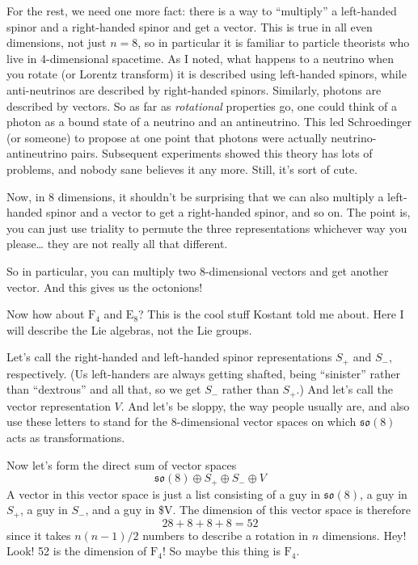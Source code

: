\documentclass{article}
\begin{document}
For the rest, we need one more fact: there is a way to ``multiply'' a
left-handed spinor and a right-handed spinor and get a vector. This is
true in all even dimensions, not just \(n = 8\), so in particular it is
familiar to particle theorists who live in 4-dimensional spacetime. As I
noted, what happens to a neutrino when you rotate (or Lorentz transform)
it is described using left-handed spinors, while anti-neutrinos are
described by right-handed spinors. Similarly, photons are described by
vectors. So as far as \emph{rotational} properties go, one could think
of a photon as a bound state of a neutrino and an antineutrino. This led
Schroedinger (or someone) to propose at one point that photons were
actually neutrino- antineutrino pairs. Subsequent experiments showed
this theory has lots of problems, and nobody sane believes it any more.
Still, it's sort of cute.

Now, in 8 dimensions, it shouldn't be surprising that we can also
multiply a left-handed spinor and a vector to get a right-handed spinor,
and so on. The point is, you can just use triality to permute the three
representations whichever way you please\ldots{} they are not really all
that different.

So in particular, you can multiply two 8-dimensional vectors and get
another vector. And this gives us the octonions!

Now how about \(\mathrm{F}_4\) and \(\mathrm{E}_8\)? This is the cool
stuff Kostant told me about. Here I will describe the Lie algebras, not
the Lie groups.

Let's call the right-handed and left-handed spinor representations
\(S_+\) and \(S_-\), respectively. (Us left-handers are always getting
shafted, being ``sinister'' rather than ``dextrous'' and all that, so we
get \(S_-\) rather than \(S_+\).) And let's call the vector
representation \(V\). And let's be sloppy, the way people usually are,
and also use these letters to stand for the 8-dimensional vector spaces
on which \(\mathfrak{so}(8)\) acts as transformations.

Now let's form the direct sum of vector spaces
\[\mathfrak{so}(8)\oplus S_+ \oplus S_- \oplus V\] A vector in this
vector space is just a list consisting of a guy in \(\mathfrak{so}(8)\),
a guy in \(S_+\), a guy in \(S_-\), and a guy in \$V. The dimension of
this vector space is therefore \[28+8+8+8=52\] since it takes
\(n(n-1)/2\) numbers to describe a rotation in \(n\) dimensions. Hey!
Look! 52 is the dimension of \(\mathrm{F}_4\)! So maybe this thing is
\(\mathrm{F}_4\).
\end{document}
